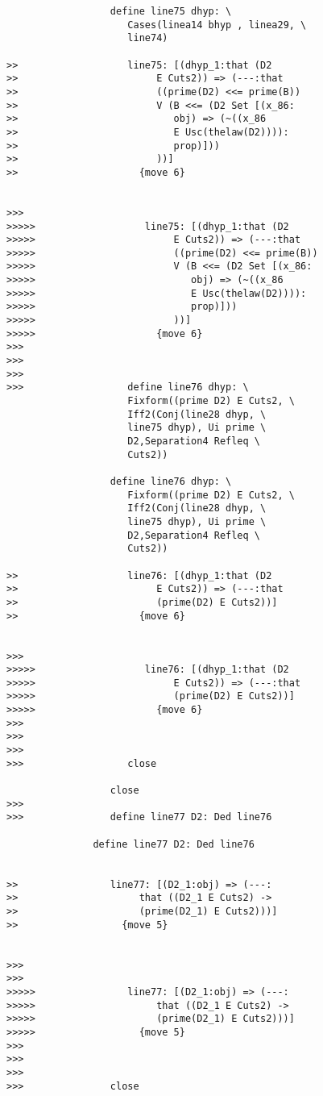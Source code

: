 \documentclass[12pt]{article}
\begin{document}
\begin{verbatim}
                  define line75 dhyp: \
                     Cases(linea14 bhyp , linea29, \
                     line74)

>>                   line75: [(dhyp_1:that (D2
>>                        E Cuts2)) => (---:that
>>                        ((prime(D2) <<= prime(B))
>>                        V (B <<= (D2 Set [(x_86:
>>                           obj) => (~((x_86
>>                           E Usc(thelaw(D2)))):
>>                           prop)]))
>>                        ))]
>>                     {move 6}


>>>
>>>>>                   line75: [(dhyp_1:that (D2
>>>>>                        E Cuts2)) => (---:that
>>>>>                        ((prime(D2) <<= prime(B))
>>>>>                        V (B <<= (D2 Set [(x_86:
>>>>>                           obj) => (~((x_86
>>>>>                           E Usc(thelaw(D2)))):
>>>>>                           prop)]))
>>>>>                        ))]
>>>>>                     {move 6}
>>>
>>>
>>>
>>>                  define line76 dhyp: \
                     Fixform((prime D2) E Cuts2, \
                     Iff2(Conj(line28 dhyp, \
                     line75 dhyp), Ui prime \
                     D2,Separation4 Refleq \
                     Cuts2))

                  define line76 dhyp: \
                     Fixform((prime D2) E Cuts2, \
                     Iff2(Conj(line28 dhyp, \
                     line75 dhyp), Ui prime \
                     D2,Separation4 Refleq \
                     Cuts2))

>>                   line76: [(dhyp_1:that (D2
>>                        E Cuts2)) => (---:that
>>                        (prime(D2) E Cuts2))]
>>                     {move 6}


>>>
>>>>>                   line76: [(dhyp_1:that (D2
>>>>>                        E Cuts2)) => (---:that
>>>>>                        (prime(D2) E Cuts2))]
>>>>>                     {move 6}
>>>
>>>
>>>
>>>                  close

                  close
>>>
>>>               define line77 D2: Ded line76

               define line77 D2: Ded line76


>>                line77: [(D2_1:obj) => (---:
>>                     that ((D2_1 E Cuts2) ->
>>                     (prime(D2_1) E Cuts2)))]
>>                  {move 5}


>>>
>>>
>>>>>                line77: [(D2_1:obj) => (---:
>>>>>                     that ((D2_1 E Cuts2) ->
>>>>>                     (prime(D2_1) E Cuts2)))]
>>>>>                  {move 5}
>>>
>>>
>>>
>>>               close


\end{verbatim}
\end{document}
